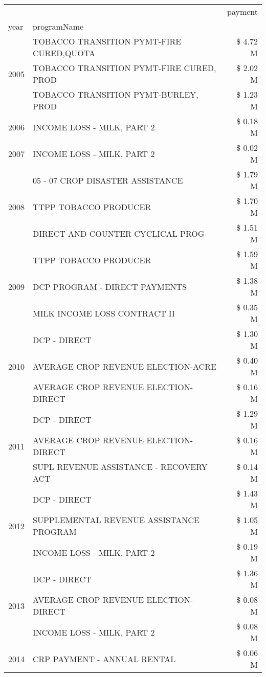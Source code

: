 \begin{tabular}{llr}
\toprule
 &  & payment \\
year & programName &  \\
\midrule
\multirow[t]{3}{*}{2005} & TOBACCO TRANSITION PYMT-FIRE CURED,QUOTA & \$ 4.72 M \\
 & TOBACCO TRANSITION PYMT-FIRE CURED, PROD & \$ 2.02 M \\
 & TOBACCO TRANSITION PYMT-BURLEY, PROD & \$ 1.23 M \\
\cline{1-3}
2006 & INCOME LOSS - MILK, PART 2 & \$ 0.18 M \\
\cline{1-3}
2007 & INCOME LOSS - MILK, PART 2 & \$ 0.02 M \\
\cline{1-3}
\multirow[t]{3}{*}{2008} & 05 - 07 CROP DISASTER ASSISTANCE & \$ 1.79 M \\
 & TTPP TOBACCO PRODUCER & \$ 1.70 M \\
 & DIRECT AND COUNTER CYCLICAL PROG & \$ 1.51 M \\
\cline{1-3}
\multirow[t]{3}{*}{2009} & TTPP TOBACCO PRODUCER & \$ 1.59 M \\
 & DCP PROGRAM - DIRECT PAYMENTS & \$ 1.38 M \\
 & MILK INCOME LOSS CONTRACT II & \$ 0.35 M \\
\cline{1-3}
\multirow[t]{3}{*}{2010} & DCP - DIRECT & \$ 1.30 M \\
 & AVERAGE CROP REVENUE ELECTION-ACRE & \$ 0.40 M \\
 & AVERAGE CROP REVENUE ELECTION-DIRECT & \$ 0.16 M \\
\cline{1-3}
\multirow[t]{3}{*}{2011} & DCP - DIRECT & \$ 1.29 M \\
 & AVERAGE CROP REVENUE ELECTION-DIRECT & \$ 0.16 M \\
 & SUPL REVENUE ASSISTANCE - RECOVERY ACT & \$ 0.14 M \\
\cline{1-3}
\multirow[t]{3}{*}{2012} & DCP - DIRECT & \$ 1.43 M \\
 & SUPPLEMENTAL REVENUE ASSISTANCE PROGRAM & \$ 1.05 M \\
 & INCOME LOSS - MILK, PART 2 & \$ 0.19 M \\
\cline{1-3}
\multirow[t]{3}{*}{2013} & DCP - DIRECT & \$ 1.36 M \\
 & AVERAGE CROP REVENUE ELECTION-DIRECT & \$ 0.08 M \\
 & INCOME LOSS - MILK, PART 2 & \$ 0.08 M \\
\cline{1-3}
\multirow[t]{3}{*}{2014} & CRP PAYMENT - ANNUAL RENTAL & \$ 0.06 M \\

\end{tabular}
